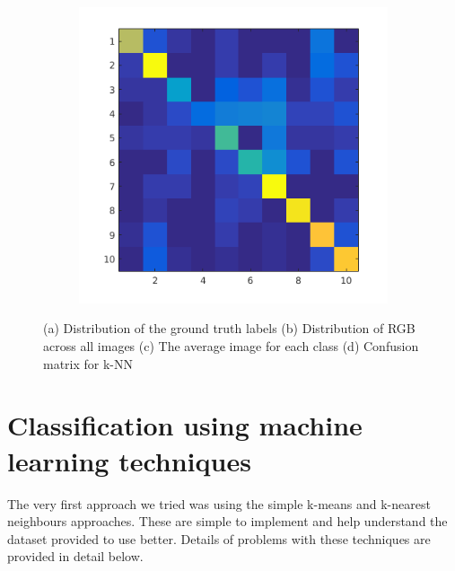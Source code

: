 \documentclass{article} %
\begin{document}
\begin{figure}
\begin{subfigure}{.24\linewidth}
        \caption{}
        \end{subfigure}
        \begin{subfigure}{.24\linewidth}
            \centering
            \includegraphics[width=.75\linewidth]{images/knn-confusion.png}
            \caption{}
        \end{subfigure}
        \caption{(a) Distribution of the ground truth labels (b) Distribution of RGB across all images (c) The average image for each class (d) Confusion matrix for k-NN}
    \end{figure}
    
    
    

\section{Classification using machine learning techniques}
    The very first approach we tried was using the simple k-means and k-nearest neighbours approaches. These are simple to implement and help understand the dataset provided to use better. Details of problems with these techniques are provided in detail below.
\end{document}

